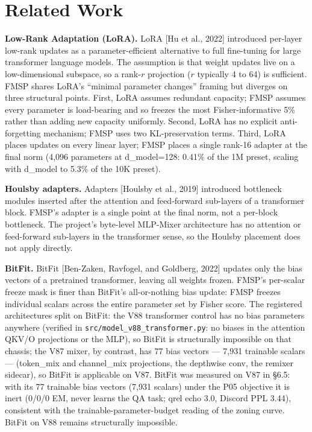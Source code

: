 \documentclass[11pt]{article}
\begin{document}
\section{Related Work}

\textbf{Low-Rank Adaptation (LoRA).} LoRA [Hu et al., 2022] introduced per-layer low-rank updates as a parameter-efficient alternative to full fine-tuning for large transformer language models. The assumption is that weight updates live on a low-dimensional subspace, so a rank-$r$ projection ($r$ typically 4 to 64) is sufficient. FMSP shares LoRA's ``minimal parameter changes'' framing but diverges on three structural points. First, LoRA assumes redundant capacity; FMSP assumes every parameter is load-bearing and so freezes the most Fisher-informative 5\% rather than adding new capacity uniformly. Second, LoRA has no explicit anti-forgetting mechanism; FMSP uses two KL-preservation terms. Third, LoRA places updates on every linear layer; FMSP places a single rank-16 adapter at the final norm (4{,}096 parameters at d\_model=128: 0.41\% of the 1M preset, scaling with d\_model to 5.3\% of the 10K preset).

\textbf{Houlsby adapters.} Adapters [Houlsby et al., 2019] introduced bottleneck modules inserted after the attention and feed-forward sub-layers of a transformer block. FMSP's adapter is a single point at the final norm, not a per-block bottleneck. The project's byte-level MLP-Mixer architecture has no attention or feed-forward sub-layers in the transformer sense, so the Houlsby placement does not apply directly.

\textbf{BitFit.} BitFit [Ben-Zaken, Ravfogel, and Goldberg, 2022] updates only the bias vectors of a pretrained transformer, leaving all weights frozen. FMSP's per-scalar freeze mask is finer than BitFit's all-or-nothing bias update: FMSP freezes individual scalars across the entire parameter set by Fisher score. The registered architectures split on BitFit: the V88 transformer control has no bias parameters anywhere (verified in \texttt{src/model\_v88\_transformer.py}: no biases in the attention QKV/O projections or the MLP), so BitFit is structurally impossible on that chassis; the V87 mixer, by contrast, has 77 bias vectors --- 7{,}931 trainable scalars --- (token\_mix and channel\_mix projections, the depthwise conv, the remixer sidecar), so BitFit is applicable on V87. BitFit was measured on V87 in \S6.5: with its 77 trainable bias vectors (7{,}931 scalars) under the P05 objective it is inert (0/0/0 EM, never learns the QA task; qrel echo 3.0, Discord PPL 3.44), consistent with the trainable-parameter-budget reading of the zoning curve. BitFit on V88 remains structurally impossible.
\end{document}
